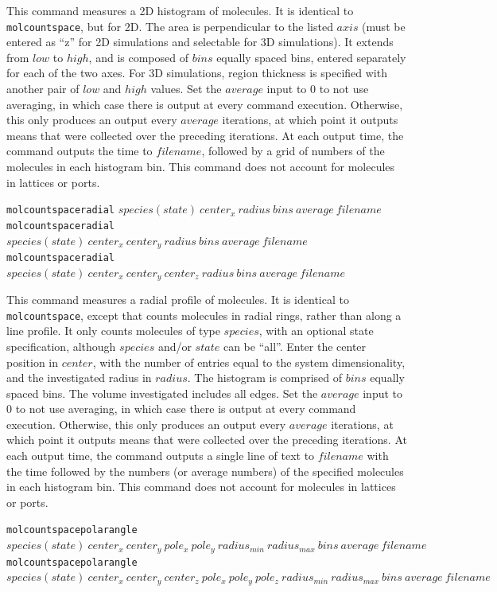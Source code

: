 \documentclass {scrbook}
\newcommand {\ttt} {\texttt}
\begin{document}
\begin{description}
This command measures a 2D histogram of molecules. It is identical to \ttt{molcountspace}, but for 2D. The area is perpendicular to the listed $axis$ (must be entered as ``z'' for 2D simulations and selectable for 3D simulations). It extends from $low$ to $high$, and is composed of $bins$ equally spaced bins, entered separately for each of the two axes. For 3D simulations, region thickness is specified with another pair of $low$ and $high$ values. Set the $average$ input to 0 to not use averaging, in which case there is output at every command execution. Otherwise, this only produces an output every $average$ iterations, at which point it outputs means that were collected over the preceding iterations. At each output time, the command outputs the time to $filename$, followed by a grid of numbers of the molecules in each histogram bin. This command does not account for molecules in lattices or ports.

\item{\ttt{molcountspaceradial} $species(state)\ center_x\ radius\ bins\ average\ filename$\\
\ttt{molcountspaceradial} $species(state)\ center_x\ center_y\ radius\ bins\ average\ filename$\\
\ttt{molcountspaceradial} $species(state)\ center_x\ center_y\ center_z\ radius\ bins\ average\ filename$}

This command measures a radial profile of molecules. It is identical to \ttt{molcountspace}, except that counts molecules in radial rings, rather than along a line profile. It only counts molecules of type $species$, with an optional state specification, although $species$ and/or $state$ can be ``all''. Enter the center position in $center$, with the number of entries equal to the system dimensionality, and the investigated radius in $radius$. The histogram is comprised of $bins$ equally spaced bins. The volume investigated includes all edges. Set the $average$ input to 0 to not use averaging, in which case there is output at every command execution. Otherwise, this only produces an output every $average$ iterations, at which point it outputs means that were collected over the preceding iterations. At each output time, the command outputs a single line of text to $filename$ with the time followed by the numbers (or average numbers) of the specified molecules in each histogram bin. This command does not account for molecules in lattices or ports.

\item{\ttt{molcountspacepolarangle} $species(state)\ center_x\ center_y\ pole_x\ pole_y\ radius_{min}\ radius_{max}\ bins\ average\ filename$\\
\ttt{molcountspacepolarangle} $species(state)\ center_x\ center_y\ center_z\ pole_x\ pole_y\ pole_z\ radius_{min}\ radius_{max}\ bins\ average\ filename$}


\end{description}
\end{document}
